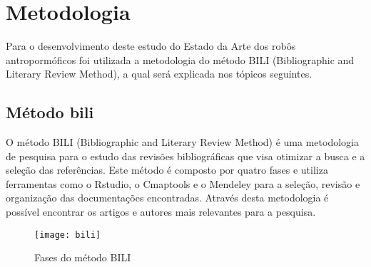 






\chapter{Metodologia}
\label{chap:metod}

Para o desenvolvimento deste estudo do Estado da Arte dos robôs antropormóficos foi utilizada a metodologia do método BILI (Bibliographic and Literary Review Method), a qual será explicada nos tópicos seguintes.

\section{Método bili}
\label{sec:bili}

O método BILI (Bibliographic and Literary Review Method) é uma metodologia de pesquisa para o estudo das revisões bibliográficas que visa otimizar a busca e a seleção das referências. Este método é composto por quatro fases e utiliza  ferramentas como o  Rstudio, o Cmaptools e o Mendeley para a seleção, revisão e organização das documentações encontradas. Através desta metodologia é possível encontrar os artigos e autores mais relevantes para a pesquisa.

\begin{figure} [H]	
    \centering
    \caption{Fases do método BILI}
    \texttt{[image: bili]}
    \label{fig:bili}
\end{figure}

